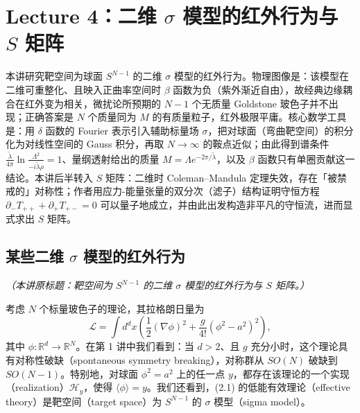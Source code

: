 \section{Lecture 4：二维 $\sigma$ 模型的红外行为与 $S$ 矩阵}

\begin{keytakeaways}
本讲研究靶空间为球面 $S^{N-1}$ 的二维 $\sigma$ 模型的红外行为。物理图像是：该模型在二维可重整化、且映入正曲率空间时 $\beta$ 函数为负（紫外渐近自由），故经典边缘耦合在红外变为相关，微扰论所预期的 $N-1$ 个无质量 Goldstone 玻色子并不出现；正确答案是 $N$ 个质量同为 $M$ 的有质量粒子，红外极限平庸。核心数学工具是：用 $\delta$ 函数的 Fourier 表示引入辅助标量场 $\sigma$，把对球面（弯曲靶空间）的积分化为对线性空间的 Gauss 积分，再取 $N\to\infty$ 的鞍点近似；由此得到谱条件 $\frac{\tilde\lambda}{4\pi}\ln\frac{\Lambda^2}{-i\tilde\lambda\rho}=1$、量纲透射给出的质量 $M=\Lambda e^{-2\pi/\tilde\lambda}$，以及 $\beta$ 函数只有单圈贡献这一结论。本讲后半转入 $S$ 矩阵：二维时 Coleman–Mandula 定理失效，存在「被禁戒的」对称性；作者用应力-能量张量的双分次（滤子）结构证明守恒方程 $\partial_-T_{++}+\partial_+T_{+-}=0$ 可以量子地成立，并由此出发构造非平凡的守恒流，进而显式求出 $S$ 矩阵。
\end{keytakeaways}

\subsection{某些二维 $\sigma$ 模型的红外行为}

\noindent\textit{（本讲原标题：靶空间为 $S^{N-1}$ 的二维 $\sigma$ 模型的红外行为与 $S$ 矩阵。）}


考虑 $N$ 个标量玻色子的理论，其拉格朗日量为
\begin{equation}
  \tag{4.1}
  \label{eq:4-1}
  \mathcal{L}=\int d^dx\left(\frac{1}{2}(\nabla\phi)^2+\frac{g}{4!}(\phi^2-a^2)^2\right),
\end{equation}
其中 $\phi:\mathbb{R}^d\to\mathbb{R}^N$。在第 1 讲中我们看到：当 $d>2$、且 $g$ 充分小时，这个理论具有对称性破缺（spontaneous symmetry breaking），对称群从 $SO(N)$ 破缺到 $SO(N-1)$。特别地，对球面 $\phi^2=a^2$ 上的任一点 $y$，都存在该理论的一个实现（realization）$\mathcal{H}_y$，使得 $\langle\phi\rangle=y$。我们还看到，(2.1) 的低能有效理论（effective theory）是靶空间（target space）为 $S^{N-1}$ 的 $\sigma$ 模型（sigma model）。

